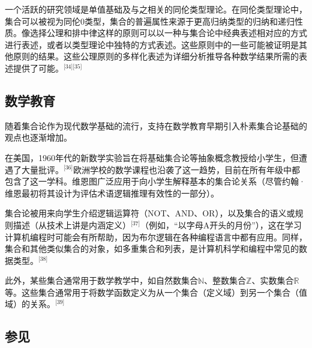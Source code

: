 一个活跃的研究领域是单值基础及与之相关的同伦类型理论。在同伦类型理论中，集合可以被视为同伦0类型，集合的普遍属性来源于更高归纳类型的归纳和递归性质。像选择公理和排中律这样的原则可以以一种与集合论中经典表述相对应的方式进行表述，或者以类型理论中独特的方式表述。这些原则中的一些可能被证明是其他原则的结果。这些公理原则的多样化表述为详细分析推导各种数学结果所需的表述提供了可能。\(^\text{[34][35]}\)
\subsection{数学教育}  
随着集合论作为现代数学基础的流行，支持在数学教育早期引入朴素集合论基础的观点也逐渐增加。

在美国，1960年代的新数学实验旨在将基础集合论等抽象概念教授给小学生，但遭遇了大量批评。\(^\text{[36]}\)欧洲学校的数学课程也沿袭了这一趋势，目前在所有年级中都包含了这一学科。维恩图广泛应用于向小学生解释基本的集合论关系（尽管约翰·维恩最初将其设计为评估术语逻辑推理有效性的一部分）。

集合论被用来向学生介绍逻辑运算符（NOT、AND、OR），以及集合的语义或规则描述（从技术上讲是内涵定义）\(^\text{[37]}\)（例如，“以字母A开头的月份”），这在学习计算机编程时可能会有所帮助，因为布尔逻辑在各种编程语言中都有应用。同样，集合和其他类似集合的对象，如多重集合和列表，是计算机科学和编程中常见的数据类型。\(^\text{[38]}\)

此外，某些集合通常用于数学教学中，如自然数集合$\mathbb{N}$、整数集合$\mathbb{Z}$、实数集合$\mathbb{R}$等。这些集合通常用于将数学函数定义为从一个集合（定义域）到另一个集合（值域）的关系。\(^\text{[39]}\)
\subsection{参见}
